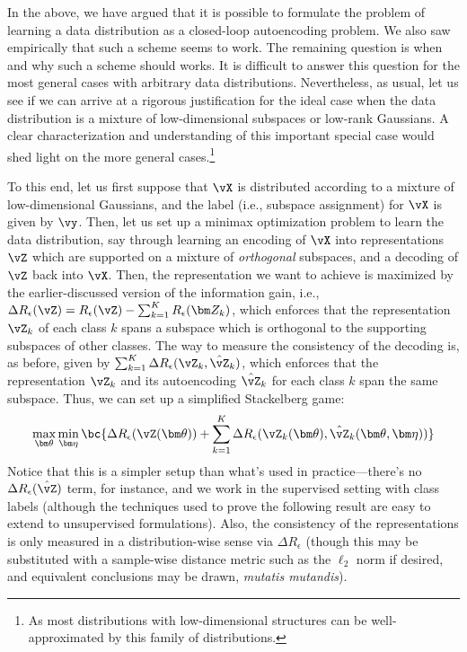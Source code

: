 \documentclass[../../book-main.tex]{subfiles}
\begin{document}
In the above, we have argued that it is possible to formulate the problem of learning a data distribution as a closed-loop autoencoding problem. We also saw empirically that such a scheme seems to work. The remaining question is when and why such a scheme should works. It is difficult to answer this question for the most general cases with arbitrary data distributions. Nevertheless, as usual, let us see if we can arrive at a rigorous justification for the ideal case when the data distribution is a mixture of low-dimensional subspaces or low-rank Gaussians. A clear characterization and understanding of this important special case would shed light on the more general cases.\footnote{As most distributions with low-dimensional structures can be well-approximated by this family of distributions.}

To this end, let us first suppose that \(\vX\) is distributed according to a mixture of low-dimensional Gaussians, and the label (i.e., subspace assignment) for \(\vX\) is given by \(\vy\). Then, let us set up a minimax optimization problem to learn the data distribution, say through learning an encoding of \(\vX\) into representations \(\vZ\) which are supported on a mixture of \textit{orthogonal} subspaces, and a decoding of \(\vZ\) back into \(\vX\). Then, the representation we want to achieve is maximized by the earlier-discussed version of the information gain, i.e., \( \Delta R_{\epsilon}(\vZ) = R_{\epsilon}(\vZ) - \sum_{k=1}^K R_{\epsilon}(\bm Z_k) \), which enforces that the representation \(\vZ_{k}\) of each class \(k\) spans a subspace which is orthogonal to the supporting subspaces of other classes. The way to measure the consistency of the decoding is, as before, given by \(\sum_{k = 1}^{K}\Delta R_\epsilon(\vZ_{k}, \hat{\vZ}_{k})\), which enforces that the representation \(\vZ_{k}\) and its autoencoding \(\hat{\vZ}_{k}\) for each class \(k\) span the same subspace. Thus, we can set up a simplified Stackelberg game:
\begin{equation}\label{eq:ctrl_msp_game}
    \max_{\bm \theta}\min_{\bm \eta}\bc{\Delta R_\epsilon(\vZ(\bm \theta)) + \sum_{k = 1}^{K}\Delta R_\epsilon(\vZ_{k}(\bm \theta), \hat{\vZ}_{k}(\bm \theta, \bm \eta))}
\end{equation}
Notice that this is a simpler setup than what's used in practice---there's no \(\Delta R_\epsilon(\hat{\vZ})\) term, for instance, and we work in the supervised setting with class labels (although the techniques used to prove the following result are easy to extend to unsupervised formulations). Also, the consistency of the representations is only measured in a distribution-wise sense via \(\Delta R_\epsilon\) (though this may be substituted with a sample-wise distance metric such as the \(\ell_{2}\) norm if desired, and equivalent conclusions may be drawn, \textit{mutatis mutandis}).
\end{document}
